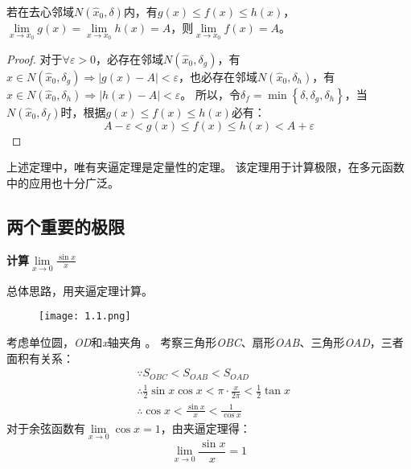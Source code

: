 \begin{theorem}[夹逼定理]
若在去心邻域$N\left( \hat{x}_0,\delta \right) $内，有$g\left( x \right) \leqslant f\left( x \right) \leqslant h\left( x \right) $，$\underset{x\rightarrow x_0}{\lim}g\left( x \right) =\underset{x\rightarrow x_0}{\lim}h\left( x \right) =A$，则$\underset{x\rightarrow x_0}{\lim}f\left( x \right) =A$。
\end{theorem}

\begin{proof}
对于$\forall \varepsilon >0$，必存在邻域$N\left( \hat{x}_0,\delta _g \right) $，有$x\in N\left( \hat{x}_0,\delta _g \right) \Rightarrow \left| g\left( x \right) -A \right|<\varepsilon $，也必存在邻域$N\left( \hat{x}_0,\delta _h \right) $，有$x\in N\left( \hat{x}_0,\delta _h \right) \Rightarrow \left| h\left( x \right) -A \right|<\varepsilon $。
所以，令$\delta _f=\min \left\{ \delta ,\delta _g,\delta _h \right\} $，当$N\left( \hat{x}_0,\delta _f \right) $时，根据$g\left( x \right) \leqslant f\left( x \right) \leqslant h\left( x \right) $必有：
\[
A-\varepsilon <g\left( x \right) \leqslant f\left( x \right) \leqslant h\left( x \right) <A+\varepsilon
\]
\end{proof}

上述定理中，唯有夹逼定理是定量性的定理。
该定理用于计算极限，在多元函数中的应用也十分广泛。

\subsection{两个重要的极限}

{\bf 计算$\underset{x\rightarrow 0}{\lim}\frac{\sin x}{x}$}

总体思路，用夹逼定理计算。

\begin{figure}[h]
\centering
\texttt{[image: 1.1.png]}
\end{figure}

考虑单位圆，{\it OD}和{\it x}轴夹角 。
考察三角形{\it OBC}、扇形{\it OAB}、三角形{\it OAD}，三者面积有关系：
\begin{align*}
&\because S_{OBC}<S_{OAB}<S_{OAD} \\
&\therefore \frac{1}{2}\sin x\cos x<\pi \cdot \frac{x}{2\pi}<\frac{1}{2}\tan x \\
&\therefore \cos x<\frac{\sin x}{x}<\frac{1}{\cos x}
\end{align*}
对于余弦函数有$\underset{x\rightarrow 0}{\lim}\cos x=1$，由夹逼定理得：
\[
\underset{x\rightarrow 0}{\lim}\frac{\sin x}{x}=1
\]

